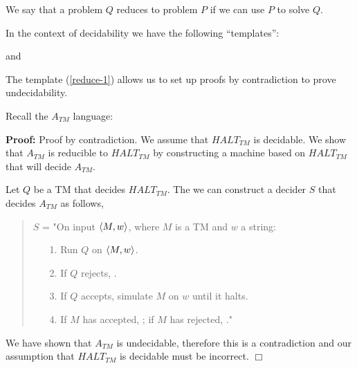 \documentclass[a4paper,blends,pdf,colorBG,slideColor]{prosper}
\begin{document}
We say that a problem $Q$ reduces to problem $P$ if we can use $P$ to solve $Q$.

In the context of decidability we have the following ``templates'':

and

The template (\ref{reduce-1}) allows us to set up proofs by contradiction to
prove undecidability.
\es

Recall the $A_{TM}$ language:

{\small
{}
}
\es

{\small
{}
{\bf Proof:} Proof by contradiction.  We assume that $HALT_{TM}$ is decidable.
We show that $A_{TM}$ is reducible to $HALT_{TM}$ by constructing a machine
based on $HALT_{TM}$ that will decide $A_{TM}$.

Let $Q$ be a TM that decides $HALT_{TM}$. The we can construct a decider
$S$ that decides $A_{TM}$ as follows,
\begin{quote}
$S$ = "On input $\langle {M,w} \rangle$, where $M$ is a TM and $w$ a string:
\begin{enumerate}
\item[1.] Run $Q$ on $\langle {M,w} \rangle$.
\item[2.] If $Q$ rejects, \reject.
\item[3.] If $Q$ accepts, simulate $M$ on $w$ until it halts.
\item[4.] If $M$ has accepted, \accept; if $M$ has rejected, \reject."
\end{enumerate}
\end{quote}
We have shown that $A_{TM}$ is undecidable, therefore this is a contradiction
and our assumption that $HALT_{TM}$ is decidable must be incorrect. $\Box$

}
\es

\end{document}
